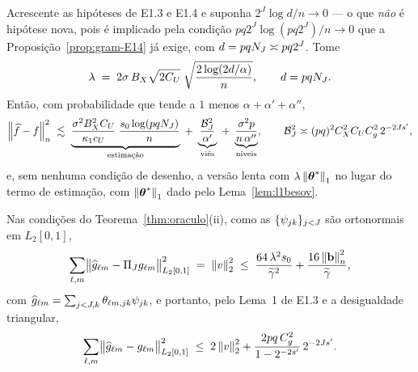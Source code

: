 \documentclass[11pt,a4paper]{article}
\newcommand{\bb}{\mathbf{b}}
\newcommand{\gtil}{\widetilde{\gamma}}
\begin{document}
\begin{corollary}\label{cor:taxas}
Acrescente as hipóteses de E1.3 e E1.4 e suponha $2^{J}\log d/n \to 0$ --- o
que \emph{não} é hipótese nova, pois é implicado pela condição
$pq2^{J}\log(pq2^{J})/n \to 0$ que a Proposição~\ref{prop:gram-E14} já exige,
com $d = pqN_{J} \asymp pq2^{J}$. Tome
\[
  \lambda \;=\; 2\sigma\,B_{X}\sqrt{2C_{U}}\;\sqrt{\frac{2\log(2d/\alpha)}{n}},
  \qquad d = pqN_{J} .
\]
Então, com probabilidade que tende a $1$ menos $\alpha + \alpha' + \alpha''$,
\[
  \left\lVert \widehat{f} - f \right\rVert_{n}^{2}
  \;\lesssim\;
  \underbrace{\frac{\sigma^{2}B_{X}^{2}C_{U}}{\kappa_{1}c_{U}}\;
  \frac{s_{0}\log(pqN_{J})}{n}}_{\text{estimação}}
  \;+\;
  \underbrace{\frac{\mathcal{B}_{J}^{2}}{\alpha'}}_{\text{viés}}
  \;+\;
  \underbrace{\frac{\sigma^{2}p}{n\,\alpha''}}_{\text{níveis}},
  \qquad
  \mathcal{B}_{J}^{2} \asymp (pq)^{2}C_{X}^{2}C_{U}C_{g}^{2}\,2^{-2Js'},
\]
e, sem nenhuma condição de desenho, a versão lenta com
$\lambda\left\lVert \boldsymbol{\theta}^{*} \right\rVert_{1}$ no lugar do termo de estimação, com
$\left\lVert \boldsymbol{\theta}^{*} \right\rVert_{1}$ dado pelo Lema~\ref{lem:l1besov}.
\end{corollary}

\begin{corollary}\label{cor:componentes}
Nas condições do Teorema~\ref{thm:oraculo}(ii), como as
$\{\psi_{jk}\}_{j<J}$ são ortonormais em $L_{2}[0,1]$,
\[
  \sum_{\cv,\md}\bigl\lVert \widehat{g}_{\cv\md} - \PiJ\gcomp{\cv}{\md}
  \bigr\rVert_{L_{2}[0,1]}^{2} \;=\; \norm{v}_{2}^{2}
  \;\le\; \frac{64\,\pen^{2}s_{0}}{\gtil^{2}} + \frac{16\normn{\bb}^{2}}{\gtil},
\]
com $\widehat{g}_{\ell m} = \sum_{j<J,k}\theta_{\ell m,jk}
\psi_{jk}$, e portanto, pelo Lema~1 de E1.3 e a desigualdade triangular,
\[
  \sum_{\ell,m}\bigl\lVert \widehat{g}_{\ell m} - g_{\ell m}
  \bigr\rVert_{L_{2}[0,1]}^{2}
  \;\le\; 2\left\lVert v \right\rVert_{2}^{2}
  + \frac{2pq\,C_{g}^{2}}{1 - 2^{-2s'}}\,2^{-2Js'} .
\]
\end{corollary}
\end{document}

